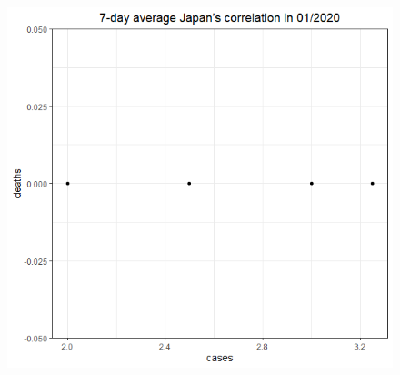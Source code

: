 \documentclass[a4paper]{article}
\theoremstyle{definition}
\begin{document}
\begin{enumerate}[1)]
\begin{figure}[H]
\begin{center}
        \includegraphics[scale = 0.3]{ix/ix.3/JPN_01_2020.png}
        

\end{center}
\end{figure}
\end{enumerate}
\end{document}
